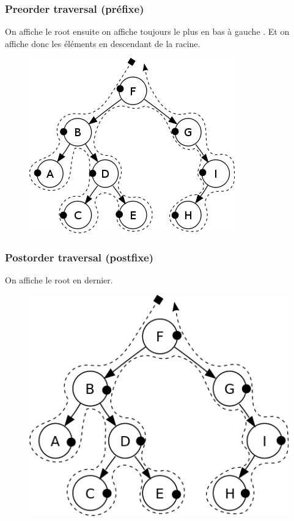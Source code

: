 \documentclass[a4paper]{article}
\begin{document}
\subsubsection{Preorder traversal (préfixe)}
On affiche le root ensuite on affiche toujours le plus en bas à gauche . Et on affiche donc les éléments en descendant de la racine.
\begin{figure}[!h]
\begin{center}
\includegraphics[scale=0.4]{preorder.png}
\end{center}
\end{figure}
\subsubsection{Postorder traversal (postfixe)}
On affiche le root en dernier. 
\begin{figure}[!h]
\begin{center}
\includegraphics[scale=0.4]{postorder.png}
\end{center}
\end{figure}
\end{document}
